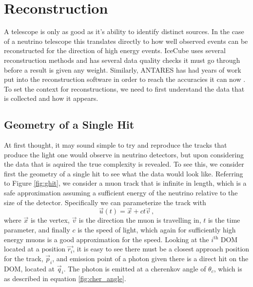 \chapter{Reconstruction}

A telescope is only as good as it's ability to identify distinct sources. In the case of a neutrino telescope this translates directly to how well observed events can be reconstructed for the direction of high energy events. IceCube uses several reconstruction methods \cite{icecube} and has several data quality checks it must go through before a result is given any weight. Similarly, ANTARES has had years of work put into the reconstruction software in order to reach the accuracies it can now \cite{antares}. To set the context for reconstructions, we need to first understand the data that is collected and how it appears. 

\section{Geometry of a Single Hit}

At first thought, it may sound simple to try and reproduce the tracks that produce the light one would observe in neutrino detectors, but upon considering the data that is aquired the true complexity is revealed. To see this, we consider first the geometry of a single hit to see what the data would look like. Referring to Figure \ref{fig:ghit}, we consider a muon track that is infinite in length, which is a safe approximation assuming a sufficient energy of the neutrino relative to the size of the detector. Specifically we can parameterize the track with
\begin{equation}
  \vec{u}(t) = \vec{x} + ct\vec{v}\, ,
\end{equation}
where $\vec{x}$ is the vertex, $\vec{v}$ is the direction the muon is travelling in, $t$ is the time parameter, and finally $c$ is the speed of light, which again for sufficiently high energy muons is a good approximation for the speed. Looking at the $i^{\text{th}}$ DOM located at a position $\vec{r_{i}}$, it is easy to see there must be a closest approach position for the track, $\vec{p}_{i}$, and emission point of a photon given there is a direct hit on the DOM, located at $\vec{q}_{i}$. The photon is emitted at a cherenkov angle of $\theta_{c}$, which is as described in equation \ref{fig:cher_angle}. 


